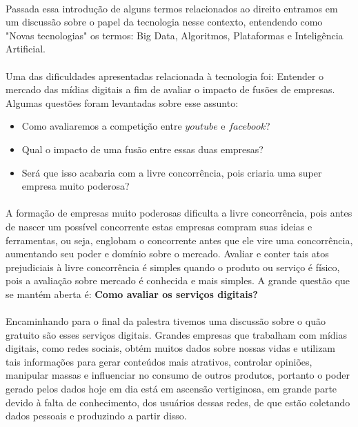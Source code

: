 \documentclass{article}
\begin{document}
	\paragraph{}
		Passada essa introdução de alguns termos relacionados ao direito entramos em
		um discussão sobre o papel da tecnologia nesse contexto, entendendo como
		"Novas tecnologias" os termos: Big Data, Algoritmos, Plataformas e Inteligência
		Artificial. 
	\paragraph{}	
		Uma das dificuldades apresentadas relacionada à tecnologia foi:
		Entender o mercado das mídias digitais a fim de avaliar o impacto de fusões de 
		empresas. Algumas questões foram levantadas sobre esse assunto:
		\begin{itemize}
			\item[]
				Como avaliaremos a competição entre $youtube$ e $facebook$? 
			\item[]	
				Qual o impacto de uma fusão entre essas duas empresas? 
			\item[]
				Será que isso acabaria com a livre concorrência, pois criaria uma super
				empresa muito poderosa?
		\end{itemize}
	\paragraph{}	
		A formação de empresas muito poderosas dificulta a livre concorrência, pois antes
		de nascer um possível concorrente estas empresas compram suas ideias e 
		ferramentas, ou seja, englobam o concorrente antes que ele vire uma 
		concorrência, aumentando seu poder e domínio sobre o mercado. Avaliar e conter
		tais atos prejudiciais à livre concorrência é simples quando o produto ou serviço
		é físico, pois a avaliação sobre mercado é conhecida e mais simples.
		A grande questão que se mantém aberta é: \textbf{Como avaliar os serviços 
		digitais?}
	\paragraph{}
		Encaminhando para o final da palestra tivemos uma discussão sobre o quão
		gratuito são esses serviços digitais. Grandes empresas que trabalham com
		mídias digitais, como redes sociais, obtém muitos dados sobre nossas vidas	
		e utilizam tais informações para gerar conteúdos mais atrativos, controlar
		opiniões, manipular massas e influenciar no consumo de outros produtos, 
		portanto o poder gerado pelos dados hoje em dia está em ascensão vertiginosa,
		em grande parte devido à falta de conhecimento, dos usuários dessas redes, de 
		que estão coletando dados pessoais e produzindo a partir disso.
\end{document}
